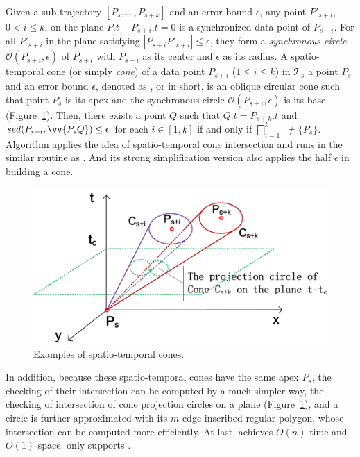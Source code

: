 Given a sub-trajectory $[P_s,...,P_{s+k}]$ and an error bound $\epsilon$, any point $P'_{s+i}$, $0< i \le k$, on the plane $P.t-P_{s+i}.t = 0$ is a synchronized data point of $P_{s+i}$. For all $P'_{s+i}$ in the plane satisfying $|P_{s+i}P'_{s+i}| \le \epsilon$, they form a \textit{synchronous circle $\mathcal{O}(P_{s+i}, \epsilon)$} of $P_{s+i}$ with $P_{s+i}$ as its center and $\epsilon$ as its radius.
%
A spatio-temporal cone (or simply \textit{cone}) of a data point $P_{s+i}$ ($1\le i\le k$) in $\dddot{\mathcal{T}}_s$ \wrt a point $P_s$ and an error bound $\epsilon$, denoted as , or  in short, is an oblique circular cone such that point $P_s$ is its apex and the synchronous circle $\mathcal{O}(P_{s+i}, \epsilon)$ is its base (Figure~\ref{fig:cis}).
%
Then, there exists a point $Q$ such that $Q.t = P_{s+k}.t$ and $sed(P_{s+i}, \vv{P_sQ})\le \epsilon$ for each $i \in [1,k]$ if and only if $\bigsqcap_{i=1}^{k}$ $\ne \{P_s\}$.
%
Algorithm \cised applies the idea of spatio-temporal cone intersection and runs in the similar routine as \siped. And its strong simplification version also applies the half $\epsilon$ in building a cone.


\begin{figure}[tb!]
	\centering
	\includegraphics[scale=0.66]{Figures/Fig-CIS.png}
	\vspace{-3ex}
	\caption{\small Examples of spatio-temporal cones.} %
	\vspace{-2ex}
	\label{fig:cis}
\end{figure}


In addition, because these spatio-temporal cones have the same apex $P_s$, the checking of their intersection can be computed by a much simpler way, \ie the checking of intersection of cone projection circles on a plane (Figure~\ref{fig:cis}), and a circle is further approximated with its $m$-edge inscribed regular polygon, whose intersection can be computed more efficiently. %
At last, \cised achieves $O(n)$ time and $O(1)$ space.
%
\cised only supports \sed.

